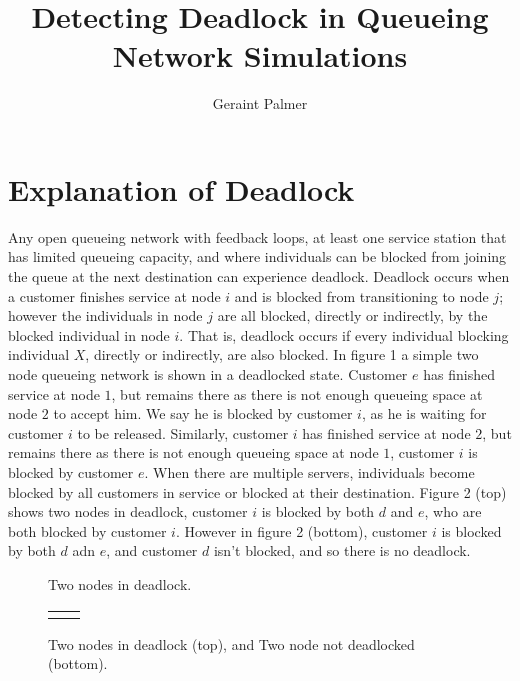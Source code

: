 \documentclass{article}
\title{Detecting Deadlock in Queueing Network Simulations}
\author{Geraint Palmer}
\date{}
\begin{document}
\onehalfspacing

\maketitle

\section{Explanation of Deadlock}
Any open queueing network with feedback loops, at least one service station that has limited queueing capacity, and where individuals can be blocked from joining the queue at the next destination can experience deadlock.
Deadlock occurs when a customer finishes service at node $i$ and is blocked from transitioning to node $j$; however the individuals in node $j$ are all blocked, directly or indirectly, by the blocked individual in node $i$.
That is, deadlock occurs if every individual blocking individual $X$, directly or indirectly, are also blocked.\newline
In figure 1 a simple two node queueing network is shown in a deadlocked state.
Customer $e$ has finished service at node $1$, but remains there as there is not enough queueing space at node $2$ to accept him.
We say he is blocked by customer $i$, as he is waiting for customer $i$ to be released.
Similarly, customer $i$ has finished service at node $2$, but remains there as there is not enough queueing space at node $1$, customer $i$ is blocked by customer $e$.\newline
When there are multiple servers, individuals become blocked by all customers in service or blocked at their destination.
Figure 2 (top) shows two nodes in deadlock, customer $i$ is blocked by both $d$ and $e$, who are both blocked by customer $i$.
However in figure 2 (bottom), customer $i$ is blocked by both $d$ adn $e$, and customer $d$ isn't blocked, and so there is no deadlock.\newline

\begin{figure}
  
  \caption{Two nodes in deadlock.}
\end{figure}

\begin{figure}
  \begin{tabular}{c c}
     \\
    \\
    
  \end{tabular}
  \caption{Two nodes in deadlock (top), and Two node not deadlocked (bottom).}
\end{figure}
\end{document}
